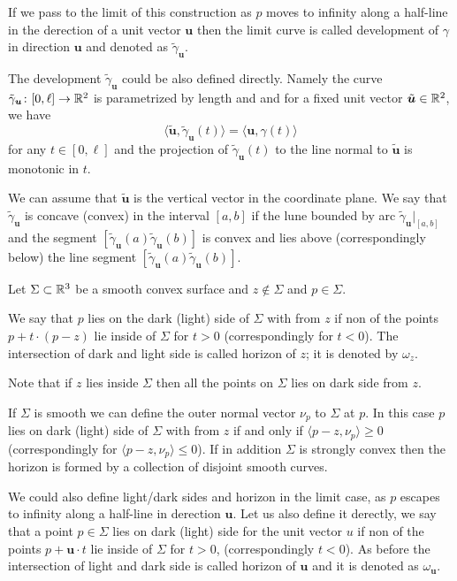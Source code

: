 \documentclass[a4paper,10pt]{amsart}
\begin{document}
If we pass to the limit of this construction as $p$ moves to infinity along a half-line in the derection of a unit vector $\bm{u}$ then the limit curve is called development of $\gamma$ in direction $\bm{u}$ and denoted as $\tilde\gamma_{\bm{u}}$.

The development $\tilde\gamma_{\bm{u}}$ could be also defined directly.
Namely the curve $\tilde\gamma_{\bm{u}}\colon[0,\ell]\to \mathbb{R}^2$
is parametrized by length and
and for a fixed unit vector $\tilde{\bm{u}}\in\mathbb{R}^2$,
we have
\[\langle \tilde{\bm{u}},\tilde\gamma_{\bm{u}}(t)\rangle
=
\langle  \bm{u},\gamma(t)\rangle\]
for any $t\in [0,\ell]$
and the projection of $\tilde\gamma_{\bm{u}}(t)$ to the line normal to $\tilde{\bm{u}}$
is monotonic in $t$.

We can assume that $\tilde{\bm{u}}$ is the vertical vector in the coordinate plane.
We say that $\tilde\gamma_{\bm{u}}$ is concave (convex) in the interval $[a,b]$ 
if the lune bounded by arc $\tilde\gamma_{\bm{u}}|_{[a,b]}$
and the segment $[\tilde\gamma_{\bm{u}}(a)\tilde\gamma_{\bm{u}}(b)]$
is convex and lies above (correspondingly below) the line segment $[\tilde\gamma_{\bm{u}}(a)\tilde\gamma_{\bm{u}}(b)]$.
 
Let $\Sigma\subset\mathbb{R}^3$ be a smooth convex surface 
and $z\notin\Sigma$ and $p\in\Sigma$.

We say that $p$ lies on the dark (light) side of $\Sigma$ with from $z$ 
if non of the points $p+t\cdot(p-z)$ lie inside of $\Sigma$ for $t>0$ (correspondingly for $t<0$).
The intersection of dark and light side is called horizon of $z$;
it is denoted by $\omega_z$.

Note that if $z$ lies inside $\Sigma$ then all the points on $\Sigma$ lies on dark side from $z$.

If $\Sigma$ is smooth we can define the outer normal vector $\nu_p$ to $\Sigma$ at $p$.
In this case $p$ lies on dark (light) side of $\Sigma$ with from $z$
if and only if $\langle p-z,\nu_p\rangle\ge 0$
(correspondingly for $\langle p-z,\nu_p\rangle\le 0$).
If in addition $\Sigma$ is strongly convex then the horizon is formed by a collection of disjoint smooth curves.

We could also define light/dark sides and horizon in the limit case,
as $p$ escapes to infinity along a half-line in derection $\bm{u}$.
Let us also define it derectly,
we say that a point $p\in\Sigma$ lies on dark (light) side for the unit vector $u$ if non of the points $p+\bm{u}\cdot t$ lie inside of $\Sigma$ for $t>0$, (correspondingly $t<0$).
As before the intersection of light and dark side is called horizon of $\bm{u}$ and it is denoted as $\omega_{\bm{u}}$.
\end{document}
